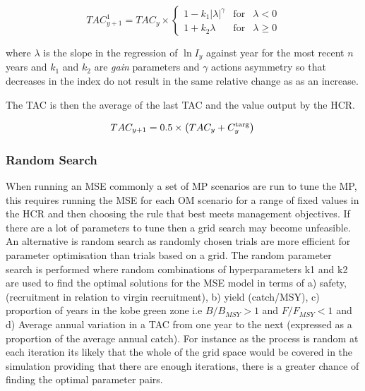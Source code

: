 \documentclass[preprint,12pt]{elsarticle}
\begin{document}
\begin{equation}
 TAC^1_{y+1}=TAC_y\times 
 \left\{\begin{array}{rcl}  
    {1-k_1|\lambda|^{\gamma}} & \mbox{for} & \lambda<0\\[0.35cm]
    {1+k_2\lambda} & \mbox{for} & \lambda\geq 0 
 \end{array}\right.
\end{equation}

where $\lambda$ is the slope in the regression of $\ln I_y$ against year for the most recent $n$ years and $k_1$ and $k_2$ are \textit{gain} parameters and $\gamma$ actions asymmetry so that decreases in the index do not result in the same relative change as as an increase.

The TAC is then the average of the last TAC and the value output by the HCR. 

\begin{equation} 
     TAC_{y+1} = 0.5\times\left(TAC_y+C^{\rm targ}_y\right)\\
\end{equation}

\subsubsection{Random Search}


When running an MSE commonly a set of MP scenarios are run to tune the MP, this requires running the MSE for each OM scenario for a range of fixed values in the HCR and then choosing the rule that best meets management objectives. If there are a lot of parameters to tune then a grid search may become unfeasible. An alternative is random search \cite{bergstra2012random} as randomly chosen trials are more efficient for parameter optimisation than trials based on a grid. The random parameter search is performed where random combinations of hyperparameters k1 and k2 are used to find the optimal solutions for the MSE model in terms of a) safety, (recruitment in relation to virgin recruitment), b) yield (catch/MSY), c) proportion of years in the kobe green zone i.e $B/B_{MSY} >1$ and $F/F_{MSY} <1$ and d) Average annual variation in a TAC from one year to the next (expressed as a proportion of the average annual catch). For instance as the process is random at each iteration its likely that the whole of the grid space would be covered in the simulation providing that there are enough iterations, there is a greater chance of finding the optimal parameter pairs. 
\end{document}
